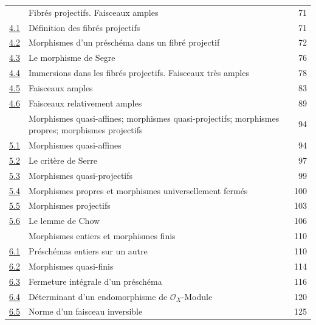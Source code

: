 \begin{longtable}{@{}p{}p{}r@{}}
\hyperref[section:II.4-fr]{\textsection4} & Fibrés projectifs. Faisceaux amples & 71\\
\hyperref[subsection:II.4.1-fr]{4.1} & Définition des fibrés projectifs & 71\\
\hyperref[subsection:II.4.2-fr]{4.2} & Morphismes d'un préschéma dans un fibré projectif & 72\\
\hyperref[subsection:II.4.3-fr]{4.3} & Le morphisme de Segre & 76\\
\hyperref[subsection:II.4.4-fr]{4.4} & Immersions dans les fibrés projectifs. Faisceaux très amples & 78\\
\hyperref[subsection:II.4.5-fr]{4.5} & Faisceaux amples & 83\\
\hyperref[II.4.6-fr]{4.6} & Faisceaux relativement amples & 89\\
\hyperref[section:II.5-fr]{\textsection5} & Morphismes quasi-affines; morphismes quasi-projectifs; morphismes propres; morphismes projectifs & 94\\
\hyperref[subsection:II.5.1-fr]{5.1} & Morphismes quasi-affines & 94\\
\hyperref[subsection:II.5.2-fr]{5.2} & Le critère de Serre & 97\\
\hyperref[subsection:II.5.3-fr]{5.3} & Morphismes quasi-projectifs & 99\\
\hyperref[subsection:II.5.4-fr]{5.4} & Morphismes propres et morphismes universellement fermés & 100\\
\hyperref[subsection:II.5.5-fr]{5.5} & Morphismes projectifs & 103\\
\hyperref[subsection:II.5.6-fr]{5.6} & Le lemme de Chow & 106\\
\hyperref[section:II.6-fr]{\textsection6} & Morphismes entiers et morphismes finis & 110\\
\hyperref[subsection:II.6.1-fr]{6.1} & Préschémas entiers sur un autre & 110\\
\hyperref[subsection:II.6.2-fr]{6.2} & Morphismes quasi-finis & 114\\
\hyperref[subsection:II.6.3-fr]{6.3} & Fermeture intégrale d'un préschéma & 116\\
\hyperref[subsection:II.6.4-fr]{6.4} & Déterminant d'un endomorphisme de $\mathcal{O}_X$-Module & 120\\
\hyperref[subsection:II.6.5-fr]{6.5} & Norme d'un faisceau inversible & 125\\

\end{longtable}
